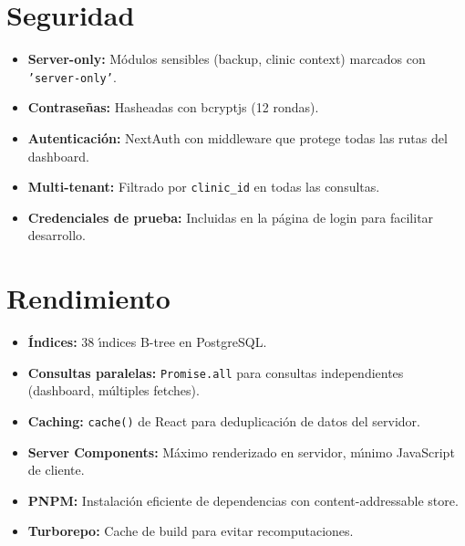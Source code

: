 \section{Seguridad}

\begin{itemize}[leftmargin=*]
    \item \textbf{Server-only:} M\'odulos sensibles (backup, clinic context)
          marcados con \texttt{'server-only'}.
    \item \textbf{Contrase\~nas:} Hasheadas con bcryptjs (12 rondas).
    \item \textbf{Autenticaci\'on:} NextAuth con middleware que protege
          todas las rutas del dashboard.
    \item \textbf{Multi-tenant:} Filtrado por \texttt{clinic\_id} en todas
          las consultas.
    \item \textbf{Credenciales de prueba:} Incluidas en la p\'agina de login
          para facilitar desarrollo.
\end{itemize}

\section{Rendimiento}

\begin{itemize}[leftmargin=*]
    \item \textbf{\'Indices:} 38 \'{\i}ndices B-tree en PostgreSQL.
    \item \textbf{Consultas paralelas:} \texttt{Promise.all} para consultas
          independientes (dashboard, m\'ultiples fetches).
    \item \textbf{Caching:} \texttt{cache()} de React para deduplicaci\'on
          de datos del servidor.
    \item \textbf{Server Components:} M\'aximo renderizado en servidor,
          m\'{\i}nimo JavaScript de cliente.
    \item \textbf{PNPM:} Instalaci\'on eficiente de dependencias con
          content-addressable store.
    \item \textbf{Turborepo:} Cache de build para evitar recomputaciones.
\end{itemize}
